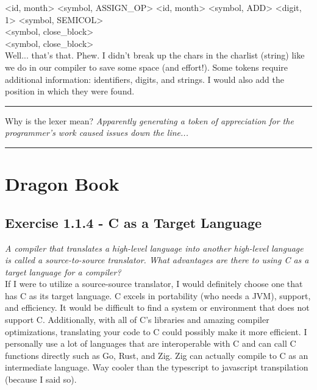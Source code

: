 \documentclass[letterpaper, 10pt]{article}
\begin{document}
\textless id, month\textgreater
\textless symbol, ASSIGN\_OP\textgreater
\textless id, month\textgreater
\textless symbol, ADD\textgreater
\textless digit, 1\textgreater
\textless symbol, SEMICOL\textgreater\\

\textless symbol, close\_block\textgreater\\
\textless symbol, close\_block\textgreater\\

Well... that's that. Phew. I didn't break up the chars in the charlist (string) like we do in our compiler to save some space (and effort!). Some tokens require additional information: identifiers, digits, and strings. I would also add the position in which they were found. \\

\hrule
\vspace{.25cm}
Why is the lexer mean? \textit{Apparently generating a token of appreciation for the programmer's work caused issues down the line...}
\vspace{.25cm}
\hrule 
\vspace{1cm}

\section{Dragon Book}
\subsection{Exercise 1.1.4 - C as a Target Language}
\textit{A compiler that translates a high-level language into another high-level language is called a source-to-source translator. What advantages are there to using C as a target language for a compiler?} \\
\newline
If I were to utilize a source-source translator, I would definitely choose one that has C as its target language. C excels in portability (who needs a JVM), support, and efficiency. It would be difficult to find a system or environment that does not support C. Additionally, with all of C's libraries and amazing compiler optimizations, translating your code to C could possibly make it more efficient. I personally use a lot of languages that are interoperable with C and can call C functions directly such as Go, Rust, and Zig. Zig can actually compile to C as an intermediate language. Way cooler than the typescript to javascript transpilation (because I said so). 
\newpage
\end{document}
